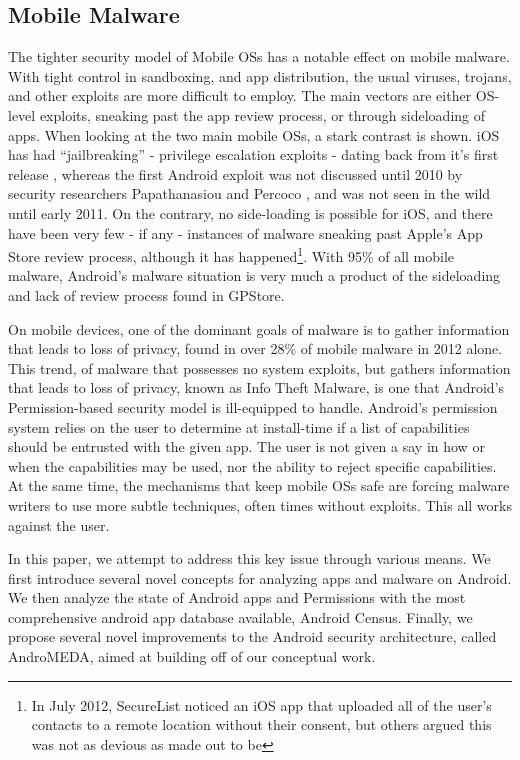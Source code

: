 \subsection{Mobile Malware}
The tighter security model of Mobile OSs has a notable effect on mobile malware. With tight control in sandboxing, and app distribution, the usual viruses, trojans, and other exploits are more difficult to employ. The main vectors are either OS-level exploits, sneaking past the app review process, or through sideloading of apps. When looking at the two main mobile OSs, a stark contrast is shown. iOS has had  ``jailbreaking'' - privilege escalation exploits - dating back from it's first release \citep{damopoulos2011isam}, whereas the first Android exploit was not discussed until 2010 by security researchers Papathanasiou and Percoco \citep{papathanasiou2010not}, and was not seen in the wild until early 2011\citep{castillo2010android}. On the contrary, no side-loading is possible for iOS, and there have been very few - if any - instances of malware sneaking past Apple's App Store review process, although it has happened\footnote{In July 2012, SecureList noticed an iOS app that uploaded all of the user's contacts to a remote location without their consent\citep{SecureList2012}, but others argued this was not as devious as made out to be\citep{trendmicroios2012} }. With 95\% of all mobile malware\citep{nq2013}, Android's malware situation is very much a product of the sideloading and lack of review process found in GPStore\citep{nq2013}. %

 On mobile devices, one of the dominant goals of malware is to gather information that leads to loss of privacy, found in over 28\% of mobile malware in 2012 alone\citep{nq2013}. This trend, of malware that possesses no system exploits, but gathers information that leads to loss of privacy, known as Info Theft Malware, is one that Android's Permission-based security model is ill-equipped to handle. Android's permission system relies on the user to determine at install-time if a list of capabilities should be entrusted with the given app. The user is not given a say in how or when the capabilities may be used, nor the ability to reject specific capabilities. At the same time, the mechanisms that keep mobile OSs safe are forcing malware writers to use more subtle techniques, often times without exploits. This all works against the user.

In this paper, we attempt to address this key issue through various means. We first introduce several novel concepts for analyzing apps and malware on Android. We then analyze the state of Android apps and Permissions with the most comprehensive android app database available, Android Census. Finally, we propose several novel improvements to the Android security architecture, called AndroMEDA, aimed at building off of our conceptual work.

